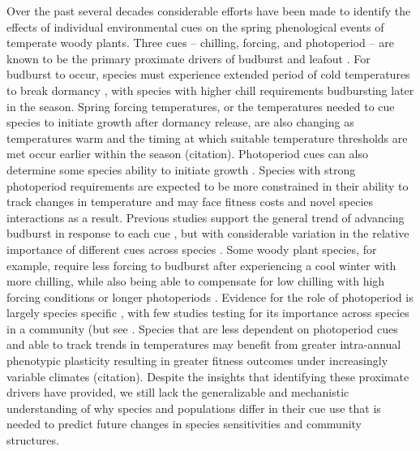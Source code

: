 \documentclass{article}\usepackage[]{graphicx}\usepackage[]{color}
\begin{document}
Over the past several decades considerable efforts have been made to identify the effects of individual environmental cues on the spring phenological events of temperate woody plants. Three cues -- chilling, forcing, and photoperiod -- are known to be the primary proximate drivers of budburst and leafout \citep{Chuine2016}. For budburst to occur, species must experience extended period of cold temperatures to break dormancy \citep{Cooke2012}, with species with higher chill requirements budbursting later in the season. Spring forcing temperatures, or the temperatures needed to cue species to initiate growth after dormancy release, are also changing as temperatures warm and the timing at which suitable temperature thresholds are met occur earlier within the season (citation). Photoperiod cues can also determine some species ability to initiate growth \citep{Basler2014,Zohner2020}. Species with strong photoperiod requirements are expected to be more constrained in their ability to track changes in temperature and may face fitness costs and novel species interactions as a result. Previous studies support the general trend of advancing budburst in response to each cue \citep{Flynn2018}, but with considerable variation in the relative importance of different cues across species \citep{Chuine2016,Flynn2018}. Some woody plant species, for example, require less forcing to budburst after experiencing a cool winter with more chilling, while also being able to compensate for low chilling with high forcing conditions or longer photoperiods \citep{Laube2014,Harrington2015,Flynn2018,Caffarra2011,Basler2014,Zohner2016}. Evidence for the role of photoperiod is largely species specific  \citep{Heide1993, Basler2014, Singh2017, Zohner2016}, with few studies testing for its importance across species in a community (but see  \cite{Flynn2018}. Species that are less dependent on photoperiod cues and able to track trends in temperatures may benefit from greater intra-annual phenotypic plasticity resulting in greater fitness outcomes under increasingly variable climates (citation). Despite the insights that identifying these proximate drivers have provided, we still lack the generalizable and mechanistic understanding of why species and populations differ in their cue use that is needed to predict future changes in species sensitivities and community structures.
\end{document}

